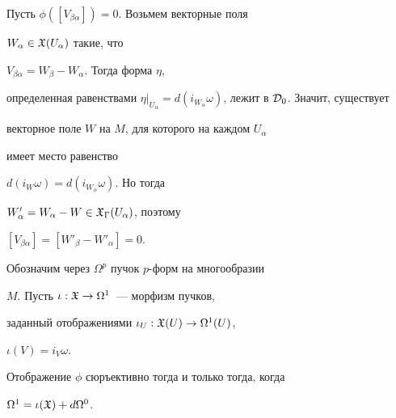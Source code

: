 \begin{pf}


Пусть $\phi([V_{\beta\alpha}])=0$. Возьмем векторные поля


$W_\alpha \in {\frak X}(U_\alpha)$ такие, что


$V_{\beta\alpha} = W_\beta - W_\alpha$. Тогда форма $\eta$,


определенная равенствами $\eta|_{U_\alpha} =


d(i_{W_\alpha}\omega)$, лежит в $\cD_0$. Значит, существует


векторное поле $W$ на $M$, для которого на каждом $U_\alpha$


имеет место равенство


$d(i_{W}\omega) = d(i_{W_\alpha}\omega)$. Но тогда


$W'_\alpha= W_\alpha - W \in {\frak X}_\Gamma(U_\alpha)$, поэтому


$[V_{\beta\alpha}] = [W'_\beta-W'_\alpha] = 0$.


\end{pf}





Обозначим через $\Omega^p$  пучок $p$-форм на многообразии


$M$. Пусть $\iota : {\frak X} \to \Omega^1$~--- морфизм пучков,


заданный отображениями $\iota_U : {\frak X}(U) \to \Omega^1(U)$,


$\iota(V) = i_V\omega$.





\begin{stat}\label{st4}


Отображение $\phi$ сюръективно тогда и только тогда, когда


$\Omega^1 =\linebreak \iota(\gX)+d\Omega^0$.


\end{stat}





